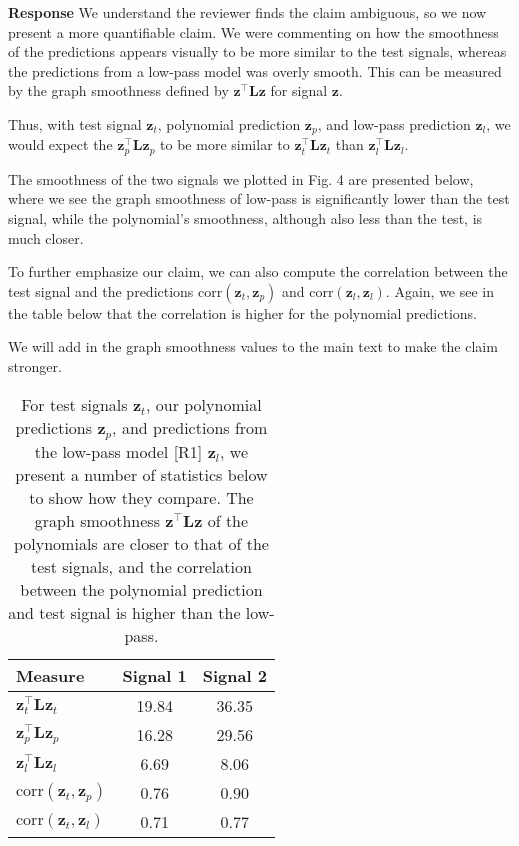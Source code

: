 \documentclass[11pt,onecolumn,journal]{IEEEtran}
\theoremstyle{definition}
\begin{document}
\textbf{Response}
We understand the reviewer finds the claim ambiguous, so we now present a more quantifiable claim. We were commenting on how the smoothness of the predictions appears visually to be more similar to the test signals, whereas the predictions from a low-pass model was overly smooth. This can be measured by the graph smoothness defined by $\mathbf{z}^\top \mathbf{L} \mathbf{z}$ for signal $\mathbf{z}$.

Thus, with test signal $\mathbf{z}_t$, polynomial prediction $\mathbf{z}_p$, and low-pass prediction $\mathbf{z}_l$, we would expect the $\mathbf{z}_p^\top \mathbf{L} \mathbf{z}_p$ to be more similar to $\mathbf{z}_t^\top \mathbf{L} \mathbf{z}_t$ than $\mathbf{z}_l^\top \mathbf{L} \mathbf{z}_l$.

The smoothness of the two signals we plotted in Fig. 4 are presented below, where we see the graph smoothness of low-pass is significantly lower than the test signal, while the polynomial's smoothness, although also less than the test, is much closer.

To further emphasize our claim, we can also compute the correlation between the test signal and the predictions $\text{corr}(\mathbf{z}_t, \mathbf{z}_p)$ and $\text{corr}(\mathbf{z}_l, \mathbf{z}_l)$. Again, we see in the table below that the correlation is higher for the polynomial predictions.

We will add in the graph smoothness values to the main text to make the claim stronger.

\begin{table}[h]
  \caption{For test signals $\mathbf{z}_t$, our polynomial predictions $\mathbf{z}_p$, and predictions from the low-pass model [R1] $\mathbf{z}_l$, we present a number of statistics below to show how they compare. The graph smoothness $\mathbf{z}^\top\mathbf{Lz}$ of the polynomials are closer to that of the test signals, and the correlation between the polynomial prediction and test signal is higher than the low-pass.}
  \centering
  \tabcolsep=0.3cm
  \begin{tabular}{lcc}
    \hline
\textbf{Measure} & \textbf{Signal 1} & \textbf{Signal 2} \\
\hline
$\mathbf{z}_t^\top\mathbf{L}\mathbf{z}_t$ & 19.84 & 36.35 \\
$\mathbf{z}_p^\top\mathbf{L}\mathbf{z}_p$ & 16.28 & 29.56 \\

$\mathbf{z}_l^\top\mathbf{L}\mathbf{z}_l$ & 6.69 & 8.06 \\

$\text{corr}(\mathbf{z}_t, \mathbf{z}_p)$ & 0.76 & 0.90 \\

$\text{corr}(\mathbf{z}_t, \mathbf{z}_l)$ & 0.71 & 0.77 \\

    \hline
\end{tabular}%
\end{table}
\end{document}
